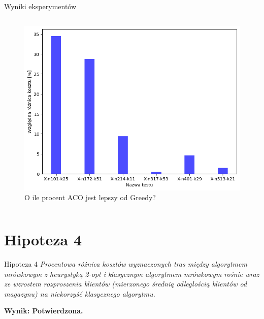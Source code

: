 \documentclass{beamer}
\begin{document}
\begin{frame}{Wyniki eksperymentów}
\begin{columns}
\begin{column}{0.55\textwidth}
\begin{figure}
                \includegraphics[width=\linewidth]{../report/img/greedy_wzgledem_zwyklego.png}
                \caption{O ile procent ACO jest lepszy od Greedy?}
            \end{figure}        
        \end{column}
    \end{columns}
\end{frame}


\section*{Hipoteza 4}

\begin{frame}{Hipoteza 4}
    \textit{Procentowa różnica kosztów wyznaczonych tras między algorytmem mrówkowym z heurystyką 2-opt i klasycznym algorytmem mrówkowym rośnie wraz ze wzrostem rozproszenia klientów (mierzonego średnią odległością klientów od magazynu) na niekorzyść klasycznego algorytmu.}
    \vspace{1em}

    \textbf{Wynik: Potwierdzona.}
\end{frame}
\end{document}
